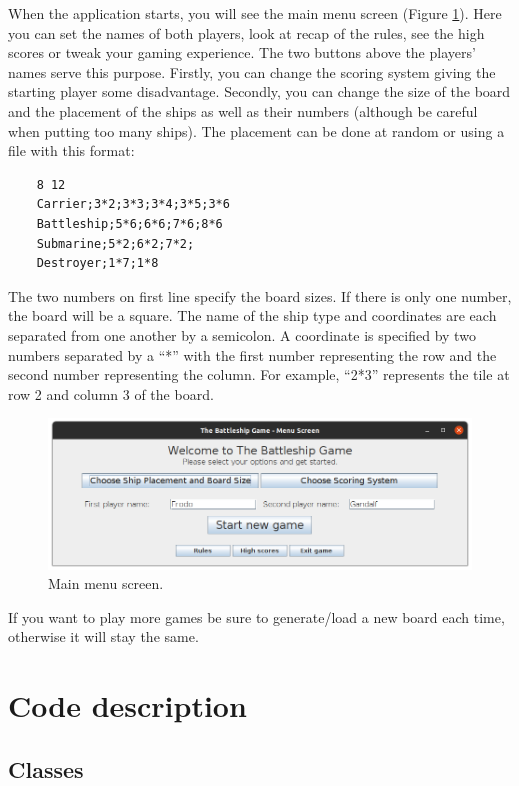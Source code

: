 \documentclass[]{article}
\begin{document}
When the application starts, you will see the main menu screen (Figure \ref{fig:menuscreenshot}). Here you can set the names of both players, look at recap of the rules, see the high scores or tweak your gaming experience. The two buttons above the players' names serve this purpose. Firstly, you can change the scoring system giving the starting player some disadvantage. Secondly, you can change the size of the board and the placement of the ships as well as their numbers (although be careful when putting too many ships). The placement can be done at random or using a file with this format:

\begin{verbatim}
	8 12
	Carrier;3*2;3*3;3*4;3*5;3*6
	Battleship;5*6;6*6;7*6;8*6
	Submarine;5*2;6*2;7*2;
	Destroyer;1*7;1*8
\end{verbatim}
The two numbers on first line specify the board sizes. If there is only one number, the board will be a square. The name of the ship type and coordinates are each separated from one another by a semicolon. A coordinate is specified by two numbers separated by a “*” with the first number representing the row and the second number representing the column. For example, “2*3” represents the tile at row 2 and column 3 of the board.

\begin{figure}[h]
	\centering
	\includegraphics[width=0.5\linewidth]{figs/menuScreenshot}
	\caption{Main menu screen.}
	\label{fig:menuscreenshot}
\end{figure}

If you want to play more games be sure to generate/load a new board each time, otherwise it will stay the same.
\newpage

\section{Code description}

\subsection{Classes}
\end{document}
